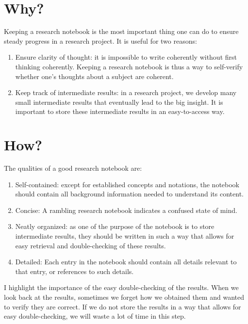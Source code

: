 \documentclass[11pt]{article}
\begin{document}
\section{Why?}

Keeping a research notebook is the most important thing one can do to ensure steady progress in a research project. It is useful for two reasons:

\begin{enumerate}
	\item Ensure clarity of thought: it is impossible to write coherently without first thinking coherently. Keeping a research notebook is thus a way to self-verify whether one's thoughts about a subject are coherent.
	\item Keep track of intermediate results: in a research project, we develop many small intermediate results that eventually lead to the big insight. It is important to store these intermediate results in an easy-to-access way.
\end{enumerate}

\section{How?}

The qualities of a good research notebook are:

\begin{enumerate}
	\item Self-contained: except for established concepts and notations, the notebook should contain all background information needed to understand its content.
	\item Concise: A rambling research notebook indicates a confused state of mind.
	\item Neatly organized: as one of the purpose of the notebook is to store intermediate results, they should be written in such a way that allows for easy retrieval and double-checking of these results.
	\item Detailed: Each entry in the notebook should contain all details relevant to that entry, or references to such details.
\end{enumerate}

I highlight the importance of the easy double-checking of the results. When we look back at the results, sometimes we forget how we obtained them and wanted to verify they are correct. If we do not store the results in a way that allows for easy double-checking, we will waste a lot of time in this step.
\\
\end{document}
